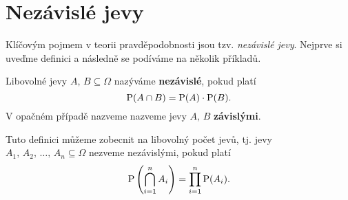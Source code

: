 \section{Nezávislé jevy}

Klíčovým pojmem v teorii pravděpodobnosti jsou tzv. \emph{nezávislé jevy}. Nejprve si uveďme definici a následně se podíváme na několik příkladů.

\begin{definition}\label{def:nezavisle_jevy}
    Libovolné jevy $A,\,B\subseteq\Omega$ nazýváme \textbf{nezávislé}, pokud platí
    \[\operatorname{\text{P}}(A\cap B)=\operatorname{\text{P}}(A)\cdot\operatorname{\text{P}}(B).\]
    V opačném případě nazveme nazveme jevy $A,\,B$ \textbf{závislými}.
\end{definition}

Tuto definici můžeme zobecnit na libovolný počet jevů, tj. jevy $A_1,\,A_2,\,\dots,\,A_n\subseteq\Omega$ nezveme nezávislými, pokud platí
\[\operatorname{\text{P}}\left(\bigcap\limits_{i=1}^{n}A_i\right)=\prod_{i=1}^{n}\operatorname{\text{P}}(A_i).\]
\medskip

